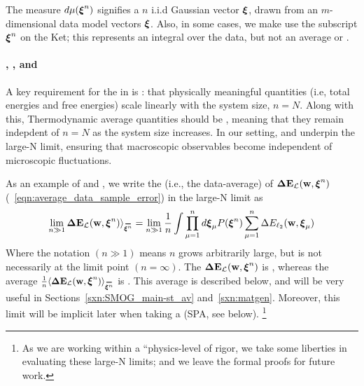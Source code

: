 The measure $d\mu(\boldsymbol{\xi}^{n})$ signifies a $n$ i.i.d Gaussian vector $\boldsymbol{\xi}$, drawn from an $m$-dimensional data model vectors $\boldsymbol{\xi}$.
Also, in some cases, we make use the subscript $\boldsymbol{\xi}^{n}$ on the Ket;  this represents an integral over the data, but not an average or \ExpectedValue.
%

\paragraph{\SizeExtensivity, \SizeIntensivity, and \SizeConsistency}
A key requirement for the \ThermodynamicLimit in \STATMECH is \emph{\SizeExtensivity}:
that physically meaningful quantities (i.e, total energies and free energies)
scale linearly with the system size, $n=N$.
Along with this, Thermodynamic average quantities should be \emph{\SizeIntensive},
meaning that they remain indepdent of $n=N$ as the system size increases.
In our setting, \SizeExtensivity and \SizeIntensivity underpin the large-N limit,
ensuring that macroscopic observables become independent of
microscopic fluctuations.

As an example of \SizeExtensivity and \SizeIntensivity, 
we write the \ExpectedValue (i.e., the data-average) of \DataSampleError $\mathbf{\Delta {E}}_{\mathcal{L}}(\mathbf{w}, \boldsymbol{\xi}^{n})$ (\EQN~\ref{eqn:average_data_sample_error})
in the large-N limit as
\begin{align}
  \lim_{n\gg 1} \DETOPXI\rangle_{\AVGNDXIn}=
  \lim_{n\gg 1}\frac{1}{n}
\int \prod_{\mu=1}^{n}d\XI_{\mu}P(\NDXIn)
  \sum_{\mu=1}^{n}\Delta E_{\ell_2}(\WVEC,\XI_{\mu})
\end{align}
Where the notation $(n \gg 1)$ means $n$ grows arbitrarily large, but is not necessarily
at the limit point $(n=\infty)$.
The \TotalDataSampleError $\mathbf{\Delta {E}}_{\mathcal{L}}(\mathbf{w}, \boldsymbol{\xi}^{n})$ is \SizeExtensive, whereas the
average $\frac{1}{n}\langle\DETOPXI\rangle_{\AVGNDXIn}$ is \SizeIntensive.
This average is described below, and will be very useful in Sections~\ref{sxn:SMOG_main-st_av}
and~\ref{sxn:matgen}.
Moreover, this limit will be implicit later when taking a \SaddlePointApproximation (SPA, see below).
\footnote{As we are working within a ``physics-level of rigor, we take some liberties in evaluating these large-N limits; and we leave the formal proofs for future work.  }

